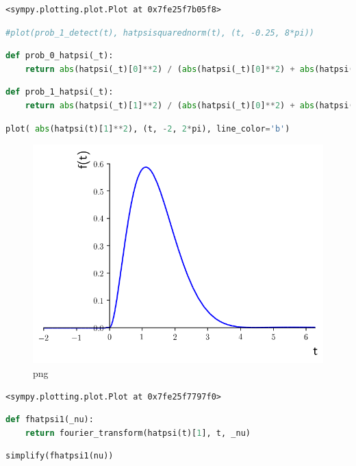 \begin{lstlisting}
<sympy.plotting.plot.Plot at 0x7fe25f7b05f8>
\end{lstlisting}

\begin{lstlisting}[language=Python]
#plot(prob_1_detect(t), hatpsisquarednorm(t), (t, -0.25, 8*pi))
\end{lstlisting}

\begin{lstlisting}[language=Python]
def prob_0_hatpsi(_t):
    return abs(hatpsi(_t)[0]**2) / (abs(hatpsi(_t)[0]**2) + abs(hatpsi(_t)[1]**2))
\end{lstlisting}

\begin{lstlisting}[language=Python]
def prob_1_hatpsi(_t):
    return abs(hatpsi(_t)[1]**2) / (abs(hatpsi(_t)[0]**2) + abs(hatpsi(_t)[1]**2))
\end{lstlisting}

\begin{lstlisting}[language=Python]
plot( abs(hatpsi(t)[1]**2), (t, -2, 2*pi), line_color='b')
\end{lstlisting}

\begin{figure}
\centering
\includegraphics[width=0.6\linewidth]{output_55_0.png}
\caption{png}
\end{figure}

\begin{lstlisting}
<sympy.plotting.plot.Plot at 0x7fe25f7797f0>
\end{lstlisting}

\begin{lstlisting}[language=Python]
def fhatpsi1(_nu):
    return fourier_transform(hatpsi(t)[1], t, _nu)
\end{lstlisting}

\begin{lstlisting}[language=Python]
simplify(fhatpsi1(nu))
\end{lstlisting}

